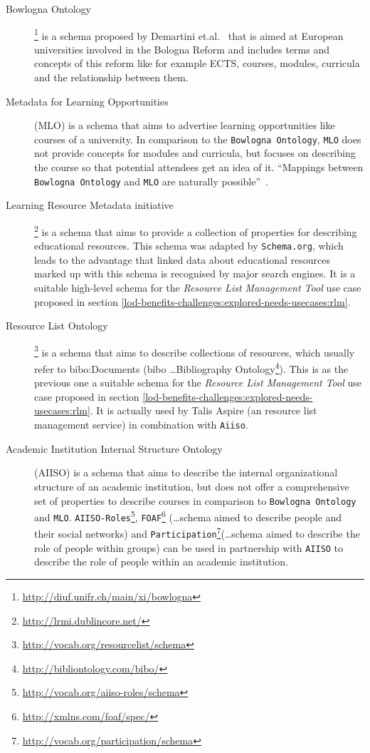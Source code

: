 \documentclass{article}
\begin{document}
\begin{description}
	\item[Bowlogna Ontology]\footnote{\url{http://diuf.unifr.ch/main/xi/bowlogna}} is a schema proposed by Demartini et.al.~\cite{demartini_bowlogna_2013} that is aimed at European universities involved in the Bologna Reform and includes terms and concepts of this reform like for example ECTS, courses, modules, curricula and the relationship between them.
	\item[Metadata for Learning Opportunities] (MLO) is a schema that aims to advertise learning opportunities like courses of a university. In comparison to the \texttt{Bowlogna Ontology}, \texttt{MLO} does not provide concepts for modules and curricula, but focuses on describing the course so that potential attendees get an idea of it. \enquote{Mappings between \texttt{Bowlogna Ontology} and \texttt{MLO} are naturally possible}~\cite{demartini_bowlogna_2013}.
	
	\item[Learning Resource Metadata initiative]\footnote{\url{http://lrmi.dublincore.net/}} is a schema that aims to provide a collection of properties for describing educational resources. This schema was adapted by \texttt{Schema.org}, which leads to the advantage that linked data about educational resources marked up with this schema is recognised by major search engines. It is a suitable high-level schema for the \textit{Resource List Management Tool} use case proposed in section \ref{lod-benefits-challenges:explored-needs-usecases:rlm}.
	
	\item[Resource List Ontology]\footnote{\url{http://vocab.org/resourcelist/schema}} is a schema that aims to describe collections of resources, which usually refer to bibo:Documents (bibo \dots{Bibliography Ontology\footnote{\url{http://bibliontology.com/bibo/}}}). This is as the previous one a suitable schema for the \textit{Resource List Management Tool} use case proposed in section \ref{lod-benefits-challenges:explored-needs-usecases:rlm}. It is actually used by Talis Aspire (an resource list management service) in combination with \texttt{Aiiso}.
	
	\item[Academic Institution Internal Structure Ontology] (AIISO) is a schema that aims to describe the internal organizational structure of an academic institution, but does not offer a comprehensive set of properties to describe courses in comparison to \texttt{Bowlogna Ontology} and \texttt{MLO}. \texttt{AIISO-Roles}\footnote{\url{http://vocab.org/aiiso-roles/schema}}, \texttt{FOAF}\footnote{\url{http://xmlns.com/foaf/spec/}} (\dots{schema aimed to describe people and their social networks}) and \texttt{Participation}\footnote{\url{http://vocab.org/participation/schema}}(\dots{schema aimed to describe the role of people within groups}) can be used in partnership with \texttt{AIISO} to describe the role of people within an academic institution.
\end{description}
\end{document}
